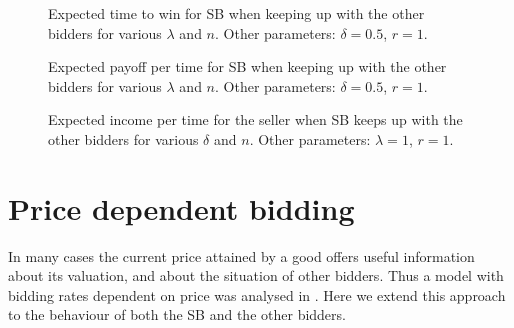 \documentclass{article}
\begin{document}
\begin{figure}
\centering
\caption{Expected time to win for SB when keeping up with the
other bidders for various $\lambda$ and $n$. Other parameters:
$\delta=0.5$, $r=1$.}\label{fig:ExpTime_SBKeepUp_VaryLambda}
\end{figure}


\begin{figure}
\centering
\caption{Expected payoff per time for SB when keeping up with the
other bidders for various $\lambda$ and $n$. Other parameters:
$\delta=0.5$,
$r=1$.}\label{fig:ExpPayoffPerTime_SBKeepUp_VaryLambda}
\end{figure}


\begin{figure}
\centering
\caption{Expected income per time for the seller when SB keeps up
with the other bidders for various $\delta$ and $n$. Other
parameters: $\lambda=1$,
$r=1$.}\label{fig:ExpIncomePerTime_SBKeepUp_VaryDelta}
\end{figure}



\section{Price dependent bidding} \label{Price-Dependent}

In many cases the current price attained by a good offers useful
information about its valuation, and about the situation of other
bidders. Thus a model with bidding rates dependent on price was
analysed in \cite{gelenbe06}. Here we extend this approach to the
behaviour of both the SB and the other bidders.
\end{document}
